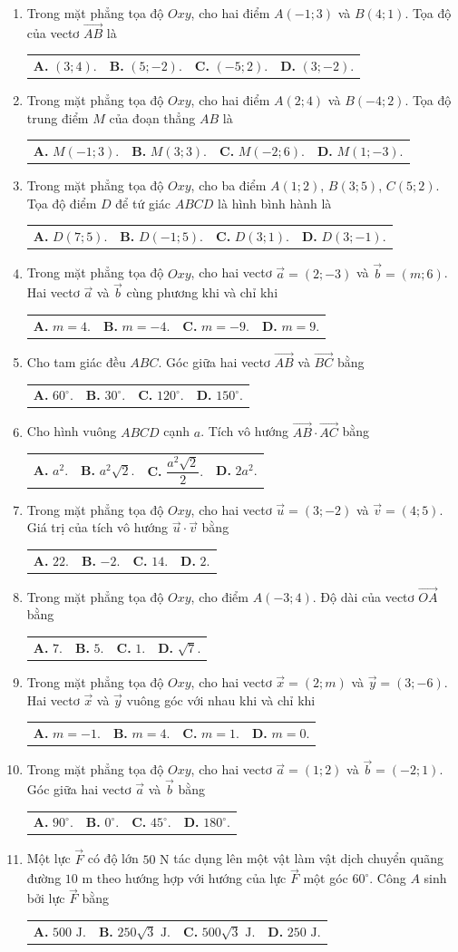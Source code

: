 \documentclass[10pt,a4paper]{article}
\makeatletter
\newcommand{\four}[4]{\par\noindent\begin{tabularx}{\linewidth}{@{}*{4}{>{\raggedright\arraybackslash}X}@{}}\textbf{A.} #1&\textbf{B.} #2&\textbf{C.} #3&\textbf{D.} #4\end{tabularx}}
\makeatother
\begin{document}
\begin{enumerate}
\item Trong mặt phẳng tọa độ $Oxy$, cho hai điểm $A(-1; 3)$ và $B(4; 1)$. Tọa độ của vectơ $\vec{AB}$ là
\four{$(3; 4)$.}{$(5; -2)$.}{$(-5; 2)$.}{$(3; -2)$.}

\item Trong mặt phẳng tọa độ $Oxy$, cho hai điểm $A(2; 4)$ và $B(-4; 2)$. Tọa độ trung điểm $M$ của đoạn thẳng $AB$ là
\four{$M(-1; 3)$.}{$M(3; 3)$.}{$M(-2; 6)$.}{$M(1; -3)$.}

\item Trong mặt phẳng tọa độ $Oxy$, cho ba điểm $A(1; 2)$, $B(3; 5)$, $C(5; 2)$. Tọa độ điểm $D$ để tứ giác $ABCD$ là hình bình hành là
\four{$D(7; 5)$.}{$D(-1; 5)$.}{$D(3; 1)$.}{$D(3; -1)$.}
\pagebreak

\item Trong mặt phẳng tọa độ $Oxy$, cho hai vectơ $\vec{a} = (2; -3)$ và $\vec{b} = (m; 6)$. Hai vectơ $\vec{a}$ và $\vec{b}$ cùng phương khi và chỉ khi
\four{$m = 4$.}{$m = -4$.}{$m = -9$.}{$m = 9$.}

\item Cho tam giác đều $ABC$. Góc giữa hai vectơ $\vec{AB}$ và $\vec{BC}$ bằng
\four{$60^\circ$.}{$30^\circ$.}{$120^\circ$.}{$150^\circ$.}

\item Cho hình vuông $ABCD$ cạnh $a$. Tích vô hướng $\vec{AB} \cdot \vec{AC}$ bằng
\four{$a^2$.}{$a^2\sqrt{2}$.}{$\dfrac{a^2\sqrt{2}}{2}$.}{$2a^2$.}

\item Trong mặt phẳng tọa độ $Oxy$, cho hai vectơ $\vec{u} = (3; -2)$ và $\vec{v} = (4; 5)$. Giá trị của tích vô hướng $\vec{u} \cdot \vec{v}$ bằng
\four{$22$.}{$-2$.}{$14$.}{$2$.}

\item Trong mặt phẳng tọa độ $Oxy$, cho điểm $A(-3; 4)$. Độ dài của vectơ $\vec{OA}$ bằng
\four{$7$.}{$5$.}{$1$.}{$\sqrt{7}$.}

\item Trong mặt phẳng tọa độ $Oxy$, cho hai vectơ $\vec{x} = (2; m)$ và $\vec{y} = (3; -6)$. Hai vectơ $\vec{x}$ và $\vec{y}$ vuông góc với nhau khi và chỉ khi
\four{$m = -1$.}{$m = 4$.}{$m = 1$.}{$m = 0$.}

\item Trong mặt phẳng tọa độ $Oxy$, cho hai vectơ $\vec{a} = (1; 2)$ và $\vec{b} = (-2; 1)$. Góc giữa hai vectơ $\vec{a}$ và $\vec{b}$ bằng
\four{$90^\circ$.}{$0^\circ$.}{$45^\circ$.}{$180^\circ$.}

\item Một lực $\vec{F}$ có độ lớn $50\text{ N}$ tác dụng lên một vật làm vật dịch chuyển quãng đường $10\text{ m}$ theo hướng hợp với hướng của lực $\vec{F}$ một góc $60^\circ$. Công $A$ sinh bởi lực $\vec{F}$ bằng
\four{$500\text{ J}$.}{$250\sqrt{3}\text{ J}$.}{$500\sqrt{3}\text{ J}$.}{$250\text{ J}$.}
\end{enumerate}
\end{document}
